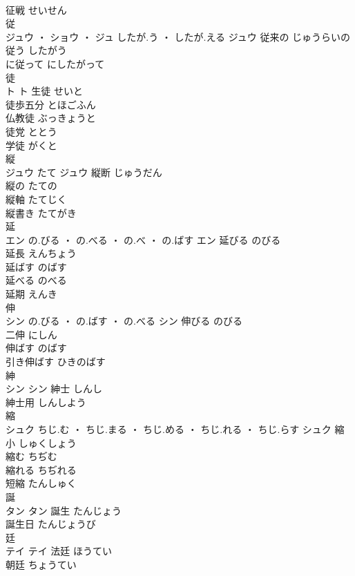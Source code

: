 \documentclass[8pt]{extreport}
\begin{document}
\begin{CJK}{UTF8}{min}
\\	征戦	せいせん	
\\	従	
\\	ジュウ ・ ショウ ・ ジュ	したが.う ・ したが.える	ジュウ	従来の	じゅうらいの	
\\	従う	したがう	
\\	に従って	にしたがって	
\\	徒	
\\	ト		ト	生徒	せいと	
\\	徒歩五分	とほごふん	
\\	仏教徒	ぶっきょうと	
\\	徒党	ととう	
\\	学徒	がくと	
\\	縦	
\\	ジュウ	たて	ジュウ	縦断	じゅうだん	
\\	縦の	たての	
\\	縦軸	たてじく	
\\	縦書き	たてがき	
\\	延	
\\	エン	の.びる ・ の.べる ・ の.べ ・ の.ばす	エン	延びる	のびる	
\\	延長	えんちょう	
\\	延ばす	のばす	
\\	延べる	のべる	
\\	延期	えんき	
\\	伸	
\\	シン	の.びる ・ の.ばす ・ の.べる	シン	伸びる	のびる	
\\	二伸	にしん	
\\	伸ばす	のばす	
\\	引き伸ばす	ひきのばす	
\\	紳	
\\	シン		シン	紳士	しんし	
\\	紳士用	しんしよう	
\\	縮	
\\	シュク	ちじ.む ・ ちじ.まる ・ ちじ.める ・ ちじ.れる ・ ちじ.らす	シュク	縮小	しゅくしょう	
\\	縮む	ちぢむ	
\\	縮れる	ちぢれる	
\\	短縮	たんしゅく	
\\	誕	
\\	タン		タン	誕生	たんじょう	
\\	誕生日	たんじょうび	
\\	廷	
\\	テイ		テイ	法廷	ほうてい	
\\	朝廷	ちょうてい	

\end{CJK}
\end{document}

